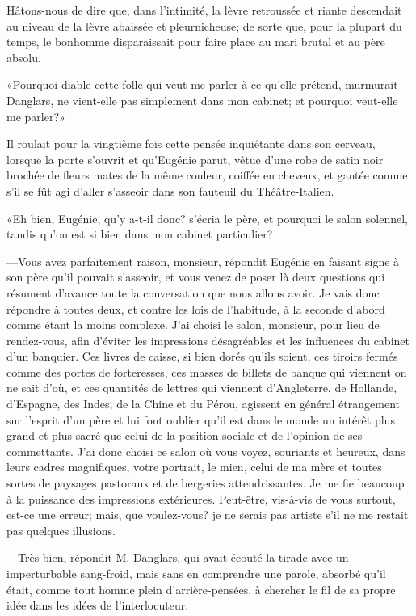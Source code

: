 Hâtons-nous de dire que, dans l'intimité, la lèvre retroussée et riante descendait au niveau de la lèvre abaissée et pleurnicheuse; de sorte que, pour la plupart du temps, le bonhomme disparaissait pour faire place au mari brutal et au père absolu. 

«Pourquoi diable cette folle qui veut me parler à ce qu'elle prétend, murmurait Danglars, ne vient-elle pas simplement dans mon cabinet; et pourquoi veut-elle me parler?» 

Il roulait pour la vingtième fois cette pensée inquiétante dans son cerveau, lorsque la porte s'ouvrit et qu'Eugénie parut, vêtue d'une robe de satin noir brochée de fleurs mates de la même couleur, coiffée en cheveux, et gantée comme s'il se fût agi d'aller s'asseoir dans son fauteuil du Théâtre-Italien. 

«Eh bien, Eugénie, qu'y a-t-il donc? s'écria le père, et pourquoi le salon solennel, tandis qu'on est si bien dans mon cabinet particulier? 

—Vous avez parfaitement raison, monsieur, répondit Eugénie en faisant signe à son père qu'il pouvait s'asseoir, et vous venez de poser là deux questions qui résument d'avance toute la conversation que nous allons avoir. Je vais donc répondre à toutes deux, et contre les lois de l'habitude, à la seconde d'abord comme étant la moins complexe. J'ai choisi le salon, monsieur, pour lieu de rendez-vous, afin d'éviter les impressions désagréables et les influences du cabinet d'un banquier. Ces livres de caisse, si bien dorés qu'ils soient, ces tiroirs fermés comme des portes de forteresses, ces masses de billets de banque qui viennent on ne sait d'où, et ces quantités de lettres qui viennent d'Angleterre, de Hollande, d'Espagne, des Indes, de la Chine et du Pérou, agissent en général étrangement sur l'esprit d'un père et lui font oublier qu'il est dans le monde un intérêt plus grand et plus sacré que celui de la position sociale et de l'opinion de ses commettants. J'ai donc choisi ce salon où vous voyez, souriants et heureux, dans leurs cadres magnifiques, votre portrait, le mien, celui de ma mère et toutes sortes de paysages pastoraux et de bergeries attendrissantes. Je me fie beaucoup à la puissance des impressions extérieures. Peut-être, vis-à-vis de vous surtout, est-ce une erreur; mais, que voulez-vous? je ne serais pas artiste s'il ne me restait pas quelques illusions. 

—Très bien, répondit M. Danglars, qui avait écouté la tirade avec un imperturbable sang-froid, mais sans en comprendre une parole, absorbé qu'il était, comme tout homme plein d'arrière-pensées, à chercher le fil de sa propre idée dans les idées de l'interlocuteur. 

